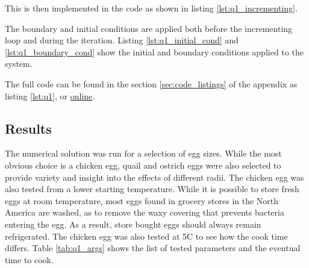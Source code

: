 \documentclass[12pt]{article}
\begin{document}
\noindent This is then implemented in the code as shown in listing \ref{lst:q1_incrementing}.


                 
\noindent The boundary and initial conditions are applied both before the incrementing loop and during the iteration. Listing \ref{lst:q1_initial_cond} and \ref{lst:q1_boundary_cond} show the initial and boundary conditions applied to the system.





\noindent The full code can be found in the section \ref{sec:code_listings} of the appendix as listing \ref{lst:q1}, or \href{https://github.com/Awbmilne/ME303-Numerical-PDE-Solution}{online}.

\subsection{Results}

The numerical solution was run for a selection of egg sizes. While the most obvious choice is a chicken egg, quail and ostrich eggs were also selected to provide variety and insight into the effects of different radii. The chicken egg was also tested from a lower starting temperature. While it is possible to store fresh eggs at room temperature, most eggs found in grocery stores in the North America are washed, as to remove the waxy covering that prevents bacteria entering the egg. As a result, store bought eggs should always remain refrigerated. The chicken egg was also tested at 5\textdegree C to see how the cook time differs. Table \ref{tab:q1_args} shows the list of tested parameters and the eventual time to cook.
\end{document}

